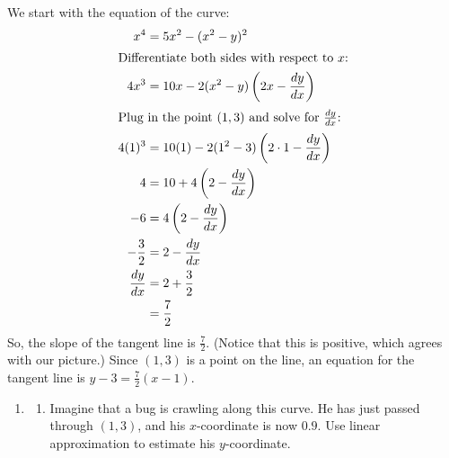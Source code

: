 \documentclass{article}
\begin{document}
\begin{enumerate}
\begin{enumerate}
    \begin{solution}      

      We start with the equation of the curve:
      \begin{align*}
        x^4 &= 5x^2 - (x^2 - y)^2 \\
        \intertext{Differentiate both sides with respect to $x$:}
        4x^3 &= 10 x - 2 (x^2 - y) \left( 2x - \frac{dy}{dx} \right) \\
        \intertext{Plug in the point $(1, 3)$ and solve for
          $\frac{dy}{dx}$:} 
        4 (1)^3 &= 10 (1) - 2 (1^2 - 3) \left( 2 \cdot 1 - \frac{dy}{dx}
        \right) \\
        4 &= 10 + 4 \left( 2 - \frac{dy}{dx} \right) \\
        -6 &= 4 \left( 2 - \frac{dy}{dx} \right) \\
        - \frac{3}{2} &= 2 - \frac{dy}{dx} \\
        \frac{dy}{dx} &= 2 + \frac{3}{2} \\
        &= \frac{7}{2}
      \end{align*}
      So, the slope of the tangent line is $\frac{7}{2}$.  (Notice that
      this is positive, which agrees with our picture.)  Since $(1, 3)$ is
      a point on the line, an equation for the tangent line is $\boxed{y -
        3 = \frac{7}{2} (x - 1)}$.
    \end{solution}

  \end{enumerate}

  \pspace{\newpage}


  \begin{enumerate}[resume]
  \item
    \begin{enumerate}
    \item \label{spring2012-mb-midterm1-implicit-differentiation-linear-approx} 
      \begin{problem}[\vfill]
        Imagine that a bug is crawling along this curve.  He has just
        passed through $(1, 3)$, and his $x$-coordinate is now $0.9$.  Use
        linear approximation to estimate his $y$-coordinate.
      \end{problem}      


\end{enumerate}
\end{enumerate}
\end{enumerate}
\end{document}
